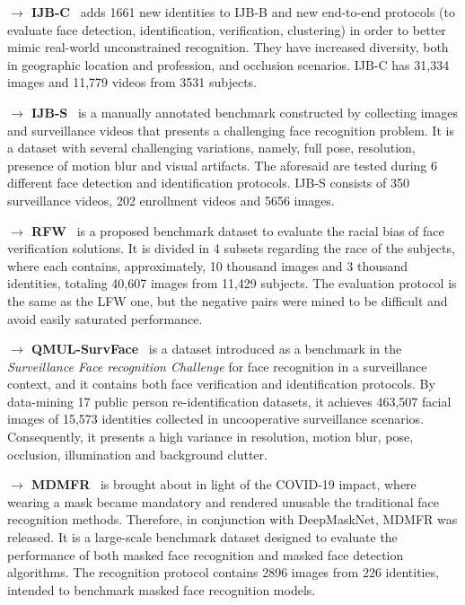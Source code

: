 \documentclass[class=report, crop=false, a4paper, 12pt]{standalone}
\begin{document}
\vspace{0.7\baselineskip}
\noindent\textbf{$\rightarrow$ IJB-C}~\autocite{mazeIARPAJanusBenchmark2018} adds 1661 new identities to IJB-B and new end-to-end protocols (to evaluate face detection, identification, verification, clustering) in order to better mimic real-world unconstrained recognition. They have increased diversity, both in geographic location and profession, and occlusion scenarios. IJB-C has 31,334 images and 11,779 videos from 3531 subjects.

\vspace{0.7\baselineskip}
\noindent\textbf{$\rightarrow$ IJB-S}~\autocite{kalkaIJBIARPAJanus2018} is a manually annotated benchmark constructed by collecting images and surveillance videos that presents a challenging face recognition problem. It is a dataset with several challenging variations, namely, full pose, resolution, presence of motion blur and visual artifacts. The aforesaid are tested during 6 different face detection and identification protocols. IJB-S consists of 350 surveillance videos, 202 enrollment videos and 5656 images. 

\vspace{0.7\baselineskip}
\noindent\textbf{$\rightarrow$ RFW}~\autocite{wangRacialFacesWild2019} is a proposed benchmark dataset to evaluate the racial bias of face verification solutions. It is divided in 4 subsets regarding the race of the subjects, where each contains, approximately, 10 thousand images and 3 thousand identities, totaling 40,607 images from 11,429 subjects. The evaluation protocol is the same as the LFW one, but the negative pairs were mined to be difficult and avoid easily saturated performance.

\vspace{0.7\baselineskip}
\noindent\textbf{$\rightarrow$ QMUL-SurvFace}~\autocite{chengSurveillanceFaceRecognition2018} is a dataset introduced as a benchmark in the \textit{Surveillance Face recognition Challenge} for face recognition in a surveillance context, and it contains both face verification and identification protocols. By data-mining 17 public person re-identification datasets, it achieves 463,507 facial images of 15,573 identities collected in uncooperative surveillance scenarios. Consequently, it presents a high variance in resolution, motion blur, pose, occlusion, illumination and background clutter.

\vspace{0.7\baselineskip}
\noindent\textbf{$\rightarrow$ MDMFR}~\autocite{ullahNovelDeepMaskNetModel2022} is brought about in light of the COVID-19 impact, where wearing a mask became mandatory and rendered unusable the traditional face recognition methods. Therefore, in conjunction with DeepMaskNet, MDMFR was released. It is a large-scale benchmark dataset designed to evaluate the performance of both masked face recognition and masked face detection algorithms. The recognition protocol contains 2896 images from 226 identities, intended to benchmark masked face recognition models.
\end{document}
